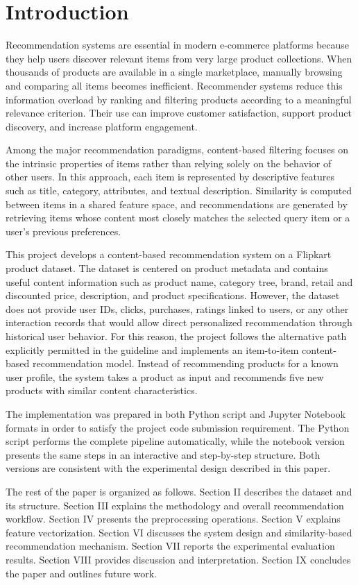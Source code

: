 \documentclass[conference]{IEEEtran}
\begin{document}
\section{Introduction}
Recommendation systems are essential in modern e-commerce platforms because they help users discover relevant items from very large product collections. When thousands of products are available in a single marketplace, manually browsing and comparing all items becomes inefficient. Recommender systems reduce this information overload by ranking and filtering products according to a meaningful relevance criterion. Their use can improve customer satisfaction, support product discovery, and increase platform engagement.

Among the major recommendation paradigms, content-based filtering focuses on the intrinsic properties of items rather than relying solely on the behavior of other users. In this approach, each item is represented by descriptive features such as title, category, attributes, and textual description. Similarity is computed between items in a shared feature space, and recommendations are generated by retrieving items whose content most closely matches the selected query item or a user's previous preferences.

This project develops a content-based recommendation system on a Flipkart product dataset. The dataset is centered on product metadata and contains useful content information such as product name, category tree, brand, retail and discounted price, description, and product specifications. However, the dataset does not provide user IDs, clicks, purchases, ratings linked to users, or any other interaction records that would allow direct personalized recommendation through historical user behavior. For this reason, the project follows the alternative path explicitly permitted in the guideline and implements an item-to-item content-based recommendation model. Instead of recommending products for a known user profile, the system takes a product as input and recommends five new products with similar content characteristics.

The implementation was prepared in both Python script and Jupyter Notebook formats in order to satisfy the project code submission requirement. The Python script performs the complete pipeline automatically, while the notebook version presents the same steps in an interactive and step-by-step structure. Both versions are consistent with the experimental design described in this paper.

The rest of the paper is organized as follows. Section II describes the dataset and its structure. Section III explains the methodology and overall recommendation workflow. Section IV presents the preprocessing operations. Section V explains feature vectorization. Section VI discusses the system design and similarity-based recommendation mechanism. Section VII reports the experimental evaluation results. Section VIII provides discussion and interpretation. Section IX concludes the paper and outlines future work.
\end{document}
